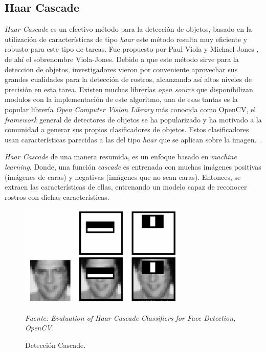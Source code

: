 \subsection{Haar Cascade}
\label{sec:Haar_Cascade}
\textit{Haar Cascade} es un efectivo método para la detección de objetos, basado en la utilización de características de tipo \textit{haar} este método resulta muy eficiente y robusto para este tipo de tareas. Fue propuesto por Paul Viola y Michael Jones \cite{viola2001rapid}, de ahí el sobrenombre Viola-Jones. Debido a que este método sirve para la deteccion de objetos, investigadores vieron por conveniente aprovechar sus grandes cualidades para la detección de rostros, alcanzando así altos niveles de precisión en esta tarea. Existen muchas librerías \textit{open source} que disponibilizan modulos con la implementación de este algoritmo, una de esas tantas es la popular librería \textit{Open Computer Vision Library} más conocida como OpenCV, el \textit{framework} general de detectores de objetos se ha popularizado y ha motivado a la comunidad a generar sus propios clasificadores de objetos. Estos clasificadores usan características parecidas a las del tipo \textit{haar} que se aplican sobre la imagen.~\cite{20padilla2012evaluation}.

\textit{Haar Cascade} de una manera resumida, es un enfoque basado en \textit{machine learning}. Donde, una función \textit{cascade} es entrenada con muchas imágenes positivas (imágenes de caras) y negativas (imágenes que no sean caras). Entonces, se extraen las características de ellas, entrenando un modelo capaz de reconocer rostros con dichas características.

\begin{figure}[H]
		\centering
		\includegraphics[width=80mm]{Imagenes/deteccion_cascade.png}
		\caption{Detección Cascade.}
		\vspace{0.15cm}
		\textit{Fuente: Evaluation of Haar Cascade Classifiers for Face Detection, OpenCV.}
		\label{fig:deteccion_cascade}
\end{figure} 

